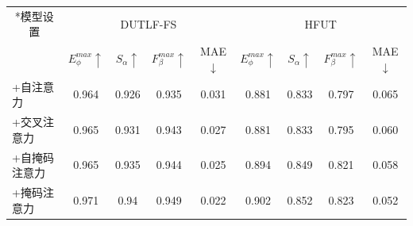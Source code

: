 \begin{table}
	\centering
	\label{chpt4:tab:abl_1}
		\begin{tabular}{lcccccccc}
			\toprule  %
			
			\multicolumn{1}{c}{ \multirow{2}*{模型设置}}	& \multicolumn{4}{c}{DUTLF-FS} & \multicolumn{4}{c}{HFUT} \\ 
			
			
			\cmidrule(r){2-5} \cmidrule(r){6-9} 
			
			& $E_{\phi}^{max}\uparrow$ & $S_{\alpha }\uparrow $ & $F_{\beta}^{max}\uparrow$ & MAE$\downarrow$ 
			& $E_{\phi}^{max}\uparrow$ & $S_{\alpha }\uparrow $ & $F_{\beta}^{max}\uparrow$ & MAE$\downarrow$
			\\
			
			\midrule
			
%			
		
			
			+自注意力 
			& 0.964 & 0.926 & 0.935 & 0.031 
			& 0.881 & 0.833 & 0.797 & 0.065   \\
			
			+交叉注意力
			& 0.965 & 0.931 & 0.943 & 0.027 
			& 0.881 & 0.833 & 0.795 & 0.060   \\
			
			+自掩码注意力  
			& 0.965 & 0.935 & 0.944 & 0.025 
			& 0.894 & 0.849 & 0.821 & 0.058   \\
			
			+掩码注意力   
			& 0.971 & 0.94  & 0.949 & 0.022 
			& 0.902 & 0.852 & 0.823 & 0.052  \\
			
			\bottomrule
		\end{tabular}
\end{table}

